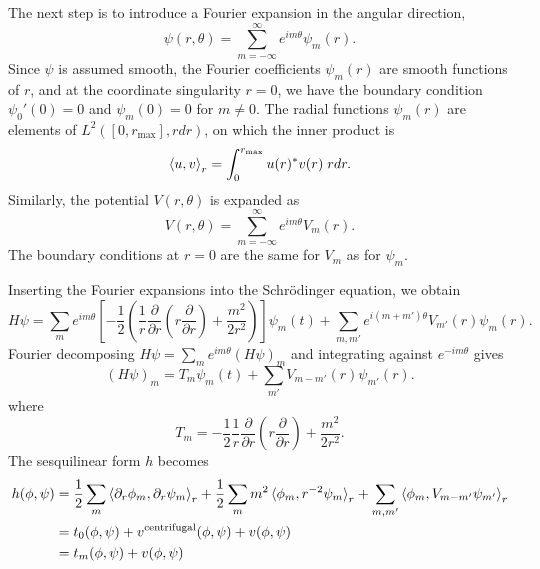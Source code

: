 \documentclass{article}
\begin{document}
The next step is to introduce a Fourier expansion in the angular direction,
\begin{equation}
    \psi(r,\theta) = \sum_{m=-\infty}^\infty e^{im\theta} \psi_m(r).
\end{equation}
Since $\psi$ is assumed smooth, the Fourier coefficients $\psi_m(r)$ are smooth functions of $r$, and at the coordinate singularity $r=0$, we have the boundary condition $\psi_0'(0) = 0$ and $\psi_m(0) = 0$ for $m\neq 0$. The radial functions $\psi_m(r)$ are
elements of $L^2([0, r_\text{max}], r dr)$, on which the inner product is
\begin{equation}
    \braket{u,v}_r = \int_0^{r_\text{max}} u(r)^* v(r)\;  r dr.
\end{equation}
Similarly, the potential $V(r,\theta)$ is expanded as
\begin{equation}
    V(r,\theta) = \sum_{m=-\infty}^\infty e^{im\theta} V_m(r).
\end{equation}
The boundary conditions at $r=0$ are the same for $V_m$ as for $\psi_m$.


Inserting the Fourier expansions into the Schr\"odinger equation, we obtain
\begin{equation}
 H\psi = \sum_m e^{im\theta}\left[  
        -\frac{1}{2} \left( \frac{1}{r} \frac{\partial}{\partial r} \left( r \frac{\partial}{\partial r} \right) + \frac{m^2}{2r^2} \right)
        \right]\psi_m(t) + \sum_{m,m'} e^{i(m+m')\theta} V_{m'}(r) \psi_{m}(r) .
\end{equation}
Fourier decomposing $H\psi = \sum_m e^{i m\theta} (H\psi)_m$ and integrating against $e^{-im\theta}$ gives
\begin{equation}
    (H\psi)_m = T_m \psi_m(t) + \sum_{m'} V_{m-m'}(r) \psi_{m'}(r) .
\end{equation}
where
\begin{equation}
 T_m = -\frac{1}{2} \frac{1}{r} \frac{\partial}{\partial r} \left( r \frac{\partial}{\partial r} \right) + \frac{m^2}{2r^2} .
\end{equation}
The sesquilinear form $h$ becomes
\begin{equation}
    \begin{split}
    h(\phi,\psi) &= \frac{1}{2} \sum_m \braket{\partial_r \phi_m, \partial_r \psi_m}_r + \frac{1}{2} \sum_m m^2 \braket{\phi_m,r^{-2}\psi_m}_r + \sum_{m,m'} \braket{\phi_m, V_{m-m'} \psi_{m'}}_r \\
    &= t_0(\phi,\psi) + v^{\text{centrifugal}}(\phi,\psi) + v(\phi,\psi) \\
    &= t_m(\phi,\psi) + v(\phi,\psi) \label{eq:form-polar}
    \end{split}
\end{equation}
\end{document}
